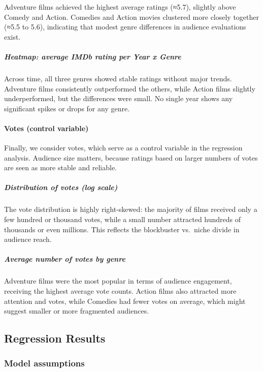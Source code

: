 \documentclass[
]{article}
\begin{document}
Adventure films achieved the highest average ratings (≈5.7), slightly
above Comedy and Action. Comedies and Action movies clustered more
closely together (≈5.5 to 5.6), indicating that modest genre differences
in audience evaluations exist.

\subparagraph{Heatmap: average IMDb rating per Year x
Genre}\label{heatmap-average-imdb-rating-per-year-x-genre}

Across time, all three genres showed stable ratings without major
trends. Adventure films consistently outperformed the others, while
Action films slightly underperformed, but the differences were small. No
single year shows any significant spikes or drops for any genre.

\paragraph{Votes (control variable)}\label{votes-control-variable}

Finally, we consider votes, which serve as a control variable in the
regression analysis. Audience size matters, because ratings based on
larger numbers of votes are seen as more stable and reliable.

\subparagraph{Distribution of votes (log
scale)}\label{distribution-of-votes-log-scale}

The vote distribution is highly right-skewed: the majority of films
received only a few hundred or thousand votes, while a small number
attracted hundreds of thousands or even millions. This reflects the
blockbuster vs.~niche divide in audience reach.

\subparagraph{Average number of votes by
genre}\label{average-number-of-votes-by-genre}

Adventure films were the most popular in terms of audience engagement,
receiving the highest average vote counts. Action films also attracted
more attention and votes, while Comedies had fewer votes on average,
which might suggest smaller or more fragmented audiences.

\subsection{Regression Results}\label{regression-results}

\subsubsection{Model assumptions}\label{model-assumptions}
\end{document}
